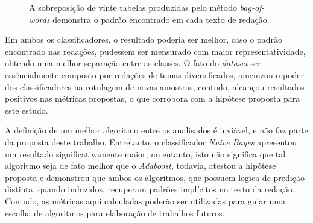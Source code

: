 \begin{figure}[H]
\begin{center}
    \end{center}
    \caption{A sobreposição de vinte tabelas produzidas pelo método 
    \textit{bag-of-words} demonstra o padrão encontrado em cada texto de redação.}
    \label{graphic:padrao}
\end{figure}

Em ambos os classificadores, o resultado poderia ser melhor, caso o padrão 
encontrado nas redações, pudessem ser mensurado com maior representatividade, 
obtendo uma melhor separação entre as classes. O fato do \textit{dataset} ser 
essêncialmente composto por redações de temas diversificados, amenizou o poder 
dos classificadores na rotulagem de novas amostras, contudo, alcançou 
resultados positivos nas métricas propostas, o que corrobora com a hipótese 
proposta para este estudo.

A definição de um melhor algoritmo entre os analisados é inviável, e não 
faz parte da proposta deste trabalho. Entretanto, o classificador 
\textit{Naive Bayes} apresentou um resultado significativamente maior, no 
entanto, isto não significa que tal algoritmo seja de fato melhor que o 
\textit{Adaboost}, todavia, atestou a hipótese proposta e demonstrou que ambos 
os algoritmos, que possuem logica de predição distinta, quando induzidos, 
recuperam padrões implícitos no texto da redação. Contudo, as métricas aqui 
calculadas poderão ser utilizadas para guiar uma escolha de algoritmos para 
elaboração de trabalhos futuros.